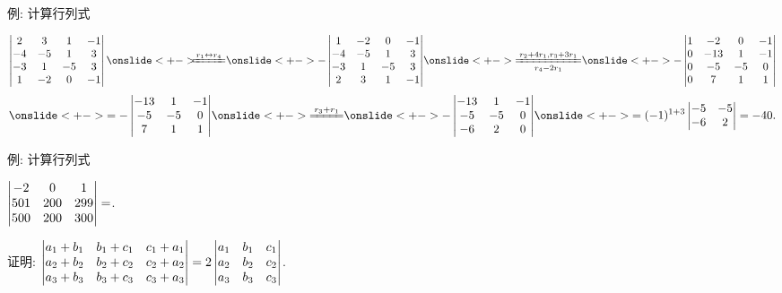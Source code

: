 \begin{frame}{例: 计算行列式}
	\onslide<+->
	\begin{example}
		\[\detm{
			 2& 3& 1&-1\\
			-4&-5& 1& 3\\
			-3& 1&-5& 3\\
			 1&-2& 0&-1}
		\onslide<+->{\hspace{-2mm}\xeq{r_1\swap r_4}}
		\onslide<+->{-\detm{
			1&-2& 0&-1\\
		 -4&-5& 1& 3\\
		 -3& 1&-5& 3\\
		  2& 3& 1&-1}}
		\onslide<+->{\xeq[r_4-2r_1]{r_2+4r_1, r_3+3r_1}}
		\onslide<+->{-\detm{
			1&-2& 0&-1\\
		  0&-13& 1&-1\\
		  0&-5&-5&0\\
		  0& 7& 1&1}}
		\]
		\[\onslide<+->{=-\detm{
				-13& 1&-1\\
				-5&-5&0\\
				 7& 1&1}}
			\onslide<+->{\xeq{r_3+r_1}}
		\onslide<+->{-\detm{
			-13& 1&-1\\
			-5&-5&0\\
			-6& 2&0}}
		\onslide<+->{=(-1)^{1+3}\detm{-5&-5\\-6&2}=-40.}
		\]
	\end{example}
\end{frame}


\begin{frame}{例: 计算行列式}
	\onslide<+->
	\begin{exercise}
		$\left|\begin{matrix}-2&0&1\\
		501&200&299\\
		500&200&300\end{matrix}\right|=$.
	\end{exercise}
	\onslide<+->
	\begin{example}
		证明:
		$\left|\begin{matrix}
			a_1+b_1&b_1+c_1&c_1+a_1\\
			a_2+b_2&b_2+c_2&c_2+a_2\\
			a_3+b_3&b_3+c_3&c_3+a_3
		\end{matrix}\right|=2\left|\begin{matrix}
			a_1&b_1&c_1\\
			a_2&b_2&c_2\\
			a_3&b_3&c_3
		\end{matrix}\right|$.
	\end{example}
\end{frame}


